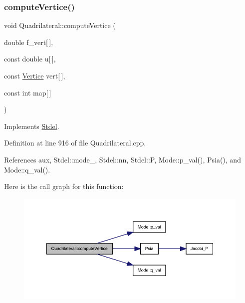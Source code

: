 \mbox{\label{classQuadrilateral_a8004370029320c1fee7d76dcc8c17cf8}} 
\subsubsection{\texorpdfstring{compute\+Vertice()}{computeVertice()}}
{\footnotesize\ttfamily void Quadrilateral\+::compute\+Vertice (\begin{DoxyParamCaption}\item[{double}]{f\+\_\+vert\mbox{[}$\,$\mbox{]},  }\item[{const double}]{u\mbox{[}$\,$\mbox{]},  }\item[{const \hyperlink{structVertice}{Vertice}}]{vert\mbox{[}$\,$\mbox{]},  }\item[{const int}]{map\mbox{[}$\,$\mbox{]} }\end{DoxyParamCaption})\hspace{0.3cm}{\ttfamily [virtual]}}



Implements \hyperlink{classStdel_a74eed41f670878759c84e2014b4a2cd5}{Stdel}.



Definition at line 916 of file Quadrilateral.\+cpp.



References aux, Stdel\+::mode\+\_\+, Stdel\+::nn, Stdel\+::P, Mode\+::p\+\_\+val(), Psia(), and Mode\+::q\+\_\+val().

Here is the call graph for this function\+:
\nopagebreak
\begin{figure}[H]
\begin{center}
\leavevmode
\includegraphics[width=350pt]{classQuadrilateral_a8004370029320c1fee7d76dcc8c17cf8_cgraph}
\end{center}
\end{figure}
\mbox{\label{classQuadrilateral_a98e726588eff16203239599aabe7d8db}} 
